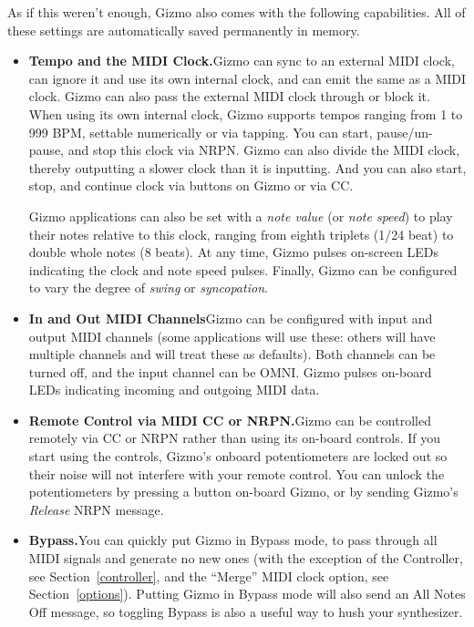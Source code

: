 \documentclass{article}
\begin{document}
As if this weren't enough, Gizmo also comes with the following capabilities.  All of these settings are automatically saved permanently in memory.

\begin{itemize}
\item {\bf Tempo and the MIDI Clock.}\quad Gizmo can sync to an external MIDI clock, can ignore it and use its own internal clock, and can emit the same as a MIDI clock.  Gizmo can also pass the external MIDI clock through or block it.  When using its own internal clock, Gizmo supports tempos ranging from 1 to 999 BPM, settable numerically or via tapping.  You can start, pause/un-pause, and stop this clock via NRPN. Gizmo can also divide the MIDI clock, thereby outputting a slower clock than it is inputting.  And you can also start, stop, and continue clock via buttons on Gizmo or via CC.

Gizmo applications can also be set with a {\it note value} (or {\it note speed}) to play their notes relative to this clock, ranging from eighth triplets (1/24 beat) to double whole notes (8 beats).  At any time, Gizmo pulses on-screen LEDs indicating the clock and note speed pulses.  Finally, Gizmo can be configured to vary the degree of {\it swing} or {\it syncopation}.

\item {\bf In and Out MIDI Channels}\quad Gizmo can be configured with input and output MIDI channels (some applications will use these: others will have multiple channels and will treat these as defaults).  Both channels can be turned off, and the input channel can be OMNI.  Gizmo pulses on-board LEDs indicating incoming and outgoing MIDI data.  

\item {\bf Remote Control via MIDI CC or NRPN.}\quad Gizmo can be controlled remotely via CC or NRPN rather than using its on-board controls.  If you start using the controls, Gizmo's onboard potentiometers are locked out so their noise will not interfere with your remote control.  You can unlock the potentiometers by pressing a button on-board Gizmo, or by sending Gizmo's {\it Release} NRPN message.  

\item {\bf Bypass.}\quad You can quickly put Gizmo in Bypass mode, to pass through all MIDI signals and generate no new ones (with the exception of the Controller, see Section~\ref{controller}, and the ``Merge'' MIDI clock option, see Section~\ref{options}).  Putting Gizmo in Bypass mode will also send an All Notes Off message, so toggling Bypass is also a useful way to hush your synthesizer.


\end{itemize}
\end{document}
